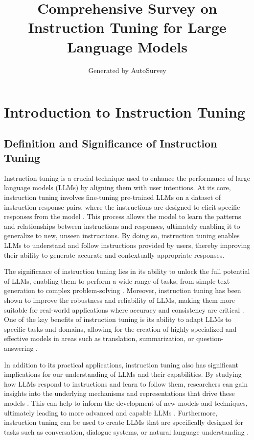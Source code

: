 \documentclass[11pt]{article}
\title{Comprehensive Survey on Instruction Tuning for Large Language Models}
\author{Generated by AutoSurvey}
\date{}
\begin{document}
\maketitle
\tableofcontents
\newpage

\section{Introduction to Instruction Tuning}

\subsection{Definition and Significance of Instruction Tuning}

Instruction tuning is a crucial technique used to enhance the performance of large language models (LLMs) by aligning them with user intentions. At its core, instruction tuning involves fine-tuning pre-trained LLMs on a dataset of instruction-response pairs, where the instructions are designed to elicit specific responses from the model \cite{ref1}. This process allows the model to learn the patterns and relationships between instructions and responses, ultimately enabling it to generalize to new, unseen instructions. By doing so, instruction tuning enables LLMs to understand and follow instructions provided by users, thereby improving their ability to generate accurate and contextually appropriate responses.

The significance of instruction tuning lies in its ability to unlock the full potential of LLMs, enabling them to perform a wide range of tasks, from simple text generation to complex problem-solving \cite{ref2}. Moreover, instruction tuning has been shown to improve the robustness and reliability of LLMs, making them more suitable for real-world applications where accuracy and consistency are critical \cite{ref3}. One of the key benefits of instruction tuning is its ability to adapt LLMs to specific tasks and domains, allowing for the creation of highly specialized and effective models in areas such as translation, summarization, or question-answering \cite{ref4}.

In addition to its practical applications, instruction tuning also has significant implications for our understanding of LLMs and their capabilities. By studying how LLMs respond to instructions and learn to follow them, researchers can gain insights into the underlying mechanisms and representations that drive these models \cite{ref5}. This can help to inform the development of new models and techniques, ultimately leading to more advanced and capable LLMs \cite{ref6}. Furthermore, instruction tuning can be used to create LLMs that are specifically designed for tasks such as conversation, dialogue systems, or natural language understanding \cite{ref7}.
\end{document}
